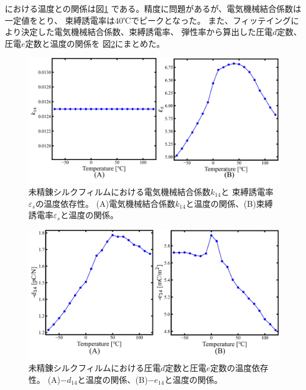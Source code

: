 \documentclass[dvipdfmx,12pt,a4paper]{jreport}
\begin{document}
			における温度との関係は図\ref{0回_電気機械結合係数_束縛誘電率_温度依存性}
			である。精度に問題があるが、電気機械結合係数は一定値をとり、
			束縛誘電率は40℃でピークとなった。
			また、フィッテイングにより決定した電気機械結合係数、束縛誘電率、
			弾性率から算出した圧電$d$定数、圧電$e$定数と温度の関係を
			図\ref{0回_d定数_e定数_温度依存性}にまとめた。
			\begin{figure}[h]
				\centering
				\includegraphics[width=\linewidth]{0回_電気機械結合係数_誘電率.jpg}
				\caption{未精錬シルクフィルムにおける電気機械結合係数$k_{14}$と
				束縛誘電率$\varepsilon_s$の温度依存性。
				(A)電気機械結合係数$k_{14}$と温度の関係、(B)束縛誘電率$\varepsilon_s$と温度の関係。}
				\label{0回_電気機械結合係数_束縛誘電率_温度依存性}
			\end{figure}
			\begin{figure}[H]
				\centering
				\includegraphics[width=\linewidth]{0回_d定数_e定数_温度依存性.jpg}
				\caption{未精錬シルクフィルムにおける圧電$d$定数と圧電$e$定数の温度依存性。
				(A)$-d_{14}$と温度の関係、(B)$-e_{14}$と温度の関係。}
				\label{0回_d定数_e定数_温度依存性}
			\end{figure}
			
\end{document}
